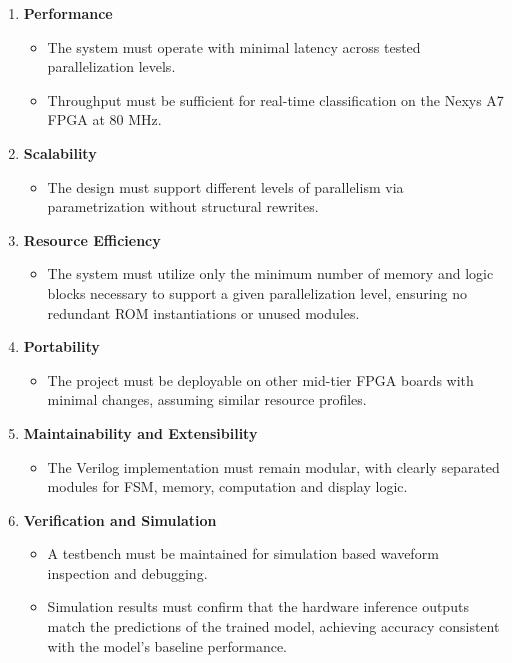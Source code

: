 \documentclass[a4paper,12pt]{report}
\begin{document}
\begin{enumerate}[label=(\roman*)]
    \item \textbf{Performance}
    \begin{itemize}
        \item The system must operate with minimal latency across tested parallelization levels.
        \item Throughput must be sufficient for real-time classification on the Nexys A7 FPGA at 80 MHz.
    \end{itemize}

    \item \textbf{Scalability}
    \begin{itemize}
        \item The design must support different levels of parallelism via parametrization without structural rewrites.
    \end{itemize}

    \item \textbf{Resource Efficiency}
    \begin{itemize}
        \item The system must utilize only the minimum number of memory and logic blocks necessary to support a given parallelization level, ensuring no redundant ROM instantiations or unused modules.
    \end{itemize}

    \item \textbf{Portability}
    \begin{itemize}
        \item The project must be deployable on other mid-tier FPGA boards with minimal changes, assuming similar resource profiles.
    \end{itemize}
    
    \item \textbf{Maintainability and Extensibility}
    \begin{itemize}
        \item The Verilog implementation must remain modular, with clearly separated modules for FSM, memory, computation and display logic.
    \end{itemize}

    \item \textbf{Verification and Simulation}
    \begin{itemize}
        \item A testbench must be maintained for simulation based waveform inspection and debugging.
        \item Simulation results must confirm that the hardware inference outputs match the predictions of the trained model, achieving accuracy consistent with the model's baseline performance.
    \end{itemize}


\end{enumerate}
\end{document}
